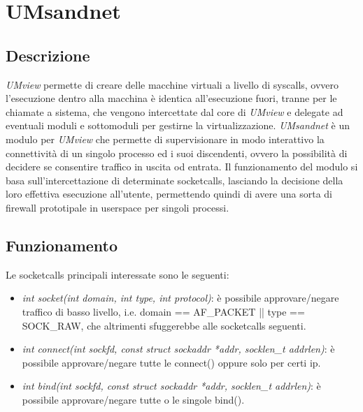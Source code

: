 \chapter{UMsandnet}
\section{Descrizione}
{\em UMview} permette di creare delle macchine virtuali a livello di syscalls, ovvero l'esecuzione dentro alla macchina è identica all'esecuzione fuori, tranne per le chiamate a sistema, che vengono intercettate dal core di {\em UMview} e delegate ad eventuali moduli e sottomoduli per gestirne la virtualizzazione.
{\em UMsandnet} è un modulo per {\em UMview} che permette di supervisionare in modo interattivo la connettività di un singolo processo ed i suoi discendenti, ovvero la possibilità di decidere se consentire traffico in uscita od entrata.
Il funzionamento del modulo si basa sull'intercettazione di determinate socketcalls, lasciando la decisione della loro effettiva esecuzione all'utente, permettendo quindi di avere una sorta di firewall prototipale in userspace per singoli processi.
\section{Funzionamento}
Le socketcalls principali interessate sono le seguenti:
\begin{itemize}
\item {\em int socket(int domain, int type, int protocol)}: è possibile approvare/negare traffico di basso livello, i.e. domain == AF\_PACKET || type == SOCK\_RAW, che altrimenti sfuggerebbe alle socketcalls seguenti.
\item {\em int connect(int sockfd, const struct sockaddr *addr, socklen\_t addrlen)}: è possibile approvare/negare tutte le connect() oppure solo per certi ip.
\item {\em int bind(int sockfd, const struct sockaddr *addr, socklen\_t addrlen)}: è possibile approvare/negare tutte o le singole bind().
\end{itemize}
